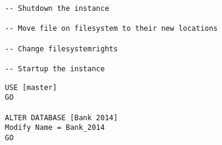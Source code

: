 \begin{enumerate}
\begin{lstlisting}[language=ms_sql, caption={Verschieben der
      Systemdatenbank tempdb}, label=admin_03_loesung_14]
-- Shutdown the instance

-- Move file on filesystem to their new locations

-- Change filesystemrights

-- Startup the instance
      \end{lstlisting}
\clearpage      
      
      
      
      \begin{lstlisting}[language=ms_sql, caption={Umbennen einer Datenbank},
      label=admin_03_loesung_15]
USE [master]
GO

ALTER DATABASE [Bank 2014]
Modify Name = Bank_2014
GO
      
      \end{lstlisting}
    \end{enumerate}
